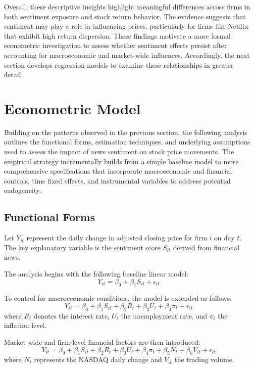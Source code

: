 \documentclass[12pt]{article}
\begin{document}
Overall, these descriptive insights highlight meaningful differences across firms in both sentiment exposure and stock return behavior. The evidence suggests that sentiment may play a role in influencing prices, particularly for firms like Netflix that exhibit high return dispersion. These findings motivate a more formal econometric investigation to assess whether sentiment effects persist after accounting for macroeconomic and market-wide influences. Accordingly, the next section develops regression models to examine these relationships in greater detail.

\section{Econometric Model}
\label{sec:Econometric}

Building on the patterns observed in the previous section, the following analysis outlines the functional forms, estimation techniques, and underlying assumptions used to assess the impact of news sentiment on stock price movements. The empirical strategy incrementally builds from a simple baseline model to more comprehensive specifications that incorporate macroeconomic and financial controls, time fixed effects, and instrumental variables to address potential endogeneity.

\subsection{Functional Forms}

Let $Y_{it}$ represent the daily change in adjusted closing price for firm $i$ on day $t$. The key explanatory variable is the sentiment score $S_{it}$ derived from financial news.

The analysis begins with the following baseline linear model:
\begin{equation}
Y_{it} = \beta_0 + \beta_1 S_{it} + \epsilon_{it}
\end{equation}

To control for macroeconomic conditions, the model is extended as follows:
\begin{equation}
Y_{it} = \beta_0 + \beta_1 S_{it} + \beta_2 R_t + \beta_3 U_t + \beta_4 \pi_t + \epsilon_{it}
\end{equation}
where $R_t$ denotes the interest rate, $U_t$ the unemployment rate, and $\pi_t$ the inflation level.

Market-wide and firm-level financial factors are then introduced:
\begin{equation}
Y_{it} = \beta_0 + \beta_1 S_{it} + \beta_2 R_t + \beta_3 U_t + \beta_4 \pi_t + \beta_5 N_t + \beta_6 V_{it} + \epsilon_{it}
\end{equation}
where $N_t$ represents the NASDAQ daily change and $V_{it}$ the trading volume.
\end{document}
